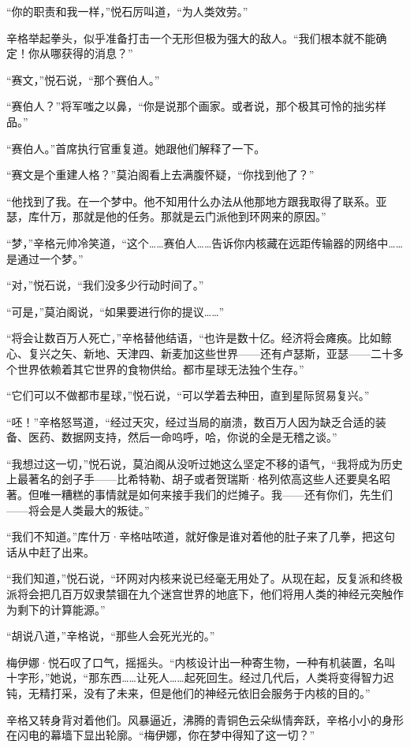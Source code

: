\documentclass[AutoFakeBold=true]{book}
\begin{document}
``你的职责和我一样，''悦石厉叫道，``为人类效劳。''

辛格举起拳头，似乎准备打击一个无形但极为强大的敌人。``我们根本就不能确定！你从哪获得的消息？''

``赛文，''悦石说，``那个赛伯人。''

``赛伯人？''将军嗤之以鼻，``你是说那个画家。或者说，那个极其可怜的拙劣样品。''

``赛伯人。''首席执行官重复道。她跟他们解释了一下。

``赛文是个重建人格？''莫泊阁看上去满腹怀疑，``你找到他了？''

``他找到了我。在一个梦中。他不知用什么办法从他那地方跟我取得了联系。亚瑟，库什万，那就是他的任务。那就是云门派他到环网来的原因。''

``梦，''辛格元帅冷笑道，``这个……赛伯人……告诉你内核藏在远距传输器的网络中……是通过一个梦。''

``对，''悦石说，``我们没多少行动时间了。''

``可是，''莫泊阁说，``如果要进行你的提议……''

``将会让数百万人死亡，''辛格替他结语，``也许是数十亿。经济将会瘫痪。比如鲸心、复兴之矢、新地、天津四、新麦加这些世界——还有卢瑟斯，亚瑟——二十多个世界依赖着其它世界的食物供给。都市星球无法独个生存。''

``它们可以不做都市星球，''悦石说，``可以学着去种田，直到星际贸易复兴。''

``呸！''辛格怒骂道，``经过天灾，经过当局的崩溃，数百万人因为缺乏合适的装备、医药、数据网支持，然后一命呜呼，哈，你说的全是无稽之谈。''

``我想过这一切，''悦石说，莫泊阁从没听过她这么坚定不移的语气，``我将成为历史上最著名的刽子手——比希特勒、胡子或者贺瑞斯·格列侬高这些人还要臭名昭著。但唯一糟糕的事情就是如何来接手我们的烂摊子。我——还有你们，先生们——将会是人类最大的叛徒。''

``我们不知道。''库什万·辛格咕哝道，就好像是谁对着他的肚子来了几拳，把这句话从中赶了出来。

``我们知道，''悦石说，``环网对内核来说已经毫无用处了。从现在起，反复派和终极派将会把几百万奴隶禁锢在九个迷宫世界的地底下，他们将用人类的神经元突触作为剩下的计算能源。''

``胡说八道，''辛格说，``那些人会死光光的。''

梅伊娜·悦石叹了口气，摇摇头。``内核设计出一种寄生物，一种有机装置，名叫十字形，''她说，``那东西……让死人……起死回生。经过几代后，人类将变得智力迟钝，无精打采，没有了未来，但是他们的神经元依旧会服务于内核的目的。''

辛格又转身背对着他们。风暴逼近，沸腾的青铜色云朵纵情奔跃，辛格小小的身形在闪电的幕墙下显出轮廓。``梅伊娜，你在梦中得知了这一切？''
\end{document}
